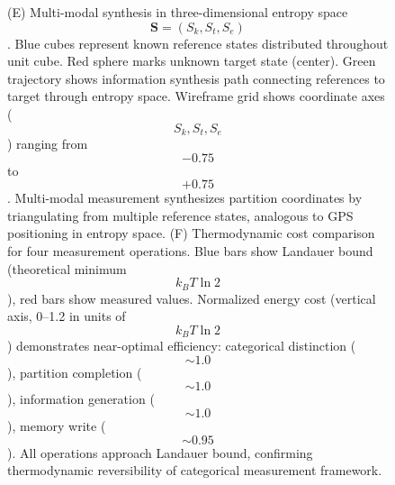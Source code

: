\begin{figure}[htbp]
{          (E) Multi-modal synthesis in three-dimensional entropy space $$\mathbf{S} = (S_k, S_t, S_e)$$. Blue cubes represent known reference states distributed throughout unit cube. Red sphere marks unknown target state (center). Green trajectory shows information synthesis path connecting references to target through entropy space. Wireframe grid shows coordinate axes ($$S_k, S_t, S_e$$) ranging from $$-0.75$$ to $$+0.75$$. Multi-modal measurement synthesizes partition coordinates by triangulating from multiple reference states, analogous to GPS positioning in entropy space. 
          (F) Thermodynamic cost comparison for four measurement operations. Blue bars show Landauer bound (theoretical minimum $$k_B T \ln 2$$), red bars show measured values. Normalized energy cost (vertical axis, 0--1.2 in units of $$k_B T \ln 2$$) demonstrates near-optimal efficiency: categorical distinction ($$\sim 1.0$$), partition completion ($$\sim 1.0$$), information generation ($$\sim 1.0$$), memory write ($$\sim 0.95$$). All operations approach Landauer bound, confirming thermodynamic reversibility of categorical measurement framework.}
          \label{fig:information_catalysis}
          \end{figure}
          

